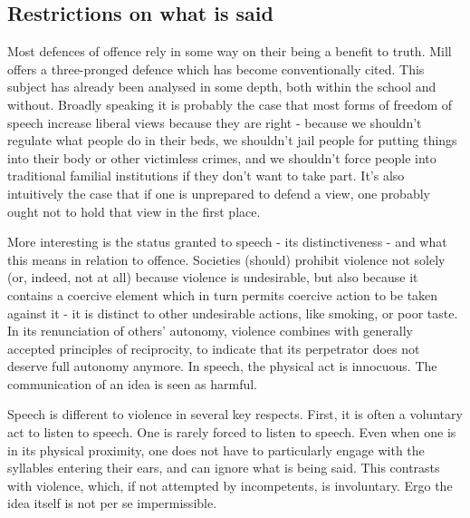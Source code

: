 \documentclass[10pt,a4paper,twoside]{article}
\begin{document}
\begin{multicols}{2}

\section{Restrictions on what is
	said}\label{restrictions-on-what-is-said}

Most defences of offence rely in some way on their being a benefit to
truth. Mill offers a three-pronged defence which has become
conventionally cited. This subject has already been analysed in some
depth, both within the school and without. Broadly speaking it is
probably the case that most forms of freedom of speech increase liberal
views because they are right - because we shouldn't regulate what people
do in their beds, we shouldn't jail people for putting things into their
body or other victimless crimes, and we shouldn't force people into
traditional familial institutions if they don't want to take part. It's
also intuitively the case that if one is unprepared to defend a view,
one probably ought not to hold that view in the first place.

More interesting is the status granted to speech - its distinctiveness -
and what this means in relation to offence. Societies (should) prohibit
violence not solely (or, indeed, not at all) because violence is
undesirable, but also because it contains a coercive element which in
turn permits coercive action to be taken against it - it is distinct to
other undesirable actions, like smoking, or poor taste. In its
renunciation of others' autonomy, violence combines with generally
accepted principles of reciprocity, to indicate that its perpetrator
does not deserve full autonomy anymore. In speech, the physical act is
innocuous. The communication of an idea is seen as harmful.

Speech is different to violence in several key respects. First, it is
often a voluntary act to listen to speech. One is rarely forced to
listen to speech. Even when one is in its physical proximity, one does
not have to particularly engage with the syllables entering their ears,
and can ignore what is being said. This contrasts with violence, which,
if not attempted by incompetents, is involuntary. Ergo the idea itself
is not per se impermissible.


\end{multicols}
\end{document}
